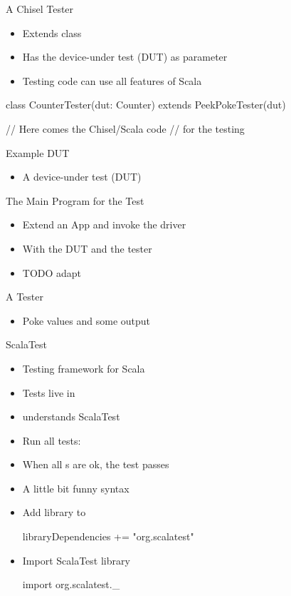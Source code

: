\begin{frame}[fragile]{A Chisel Tester}
\begin{itemize}
\item Extends class 
\item Has the device-under test (DUT) as parameter
\item Testing code can use all features of Scala
\end{itemize}
\begin{chisel}
class CounterTester(dut: Counter) extends PeekPokeTester(dut) {

  // Here comes the Chisel/Scala code
  // for the testing
}
\end{chisel}
\end{frame}

\begin{frame}[fragile]{Example DUT}
\begin{itemize}
\item A device-under test (DUT)
\end{itemize}
\end{frame}


\begin{frame}[fragile]{The Main Program for the Test}
\begin{itemize}
\item Extend an App and invoke the  driver
\item With the DUT and the tester
\item TODO adapt
\end{itemize}
\end{frame}

\begin{frame}[fragile]{A Tester}
\begin{itemize}
\item Poke values and  some output
\end{itemize}
\end{frame}

\begin{frame}[fragile]{ScalaTest}
\begin{itemize}
\item Testing framework for Scala
\item Tests live in 
\item {} understands ScalaTest
\item Run all tests:
\item When all s are ok, the test passes
\item A little bit funny syntax
\item Add library to 
\begin{chisel}
libraryDependencies += "org.scalatest" %
\end{chisel}
\item Import ScalaTest library
\begin{chisel}
import org.scalatest._
\end{chisel}
\end{itemize}
\end{frame}


